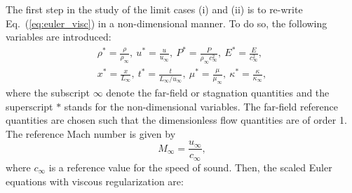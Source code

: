 \documentclass[review,10pt]{elsarticle}
\newcommand{\eqt}[1]{Eq.~(\ref{#1})}                     %
\newcommand{\sct}[1]{Section~\ref{#1}}                   %
\newcommand{\tcr}[1]{\textcolor{red}{#1}}
\begin{document}
%
The first step in the study of the limit cases (i) and (ii) is to re-write \eqt{eq:euler_visc} in 
a non-dimensional manner. To do so, the following variables are introduced:
%
\begin{multline}
\label{eq:norm_param}
\rho^*   = \frac{\rho}{\rho_\infty}           ,\
u^*      = \frac{u}{u_\infty}                 ,\
P^*      = \frac{P}{\rho_\infty c^2_\infty}   ,\
E^*      = \frac{E}{c^2_\infty }              ,\\
x^* = \frac{x}{L_\infty}                      ,\
t^* = \frac{t}{L_\infty / u_\infty}           ,\ 
\mu^*    = \frac{\mu}{\mu_\infty}             ,\
\kappa^* = \frac{\kappa}{\kappa_\infty}       ,
\end{multline}
%
where  the subscript $\infty$ denote the far-field or stagnation quantities and the superscript $*$ 
stands for the non-dimensional variables. The far-field reference quantities are chosen such that the 
dimensionless flow quantities are of order 1. The reference Mach number is given by
%
\begin{equation}
M_\infty = \frac{u_\infty}{c_\infty} ,
\end{equation}
%
where $c_\infty$ is a reference value for the speed of sound. Then, the scaled Euler equations with viscous regularization are:
%
\end{document}

